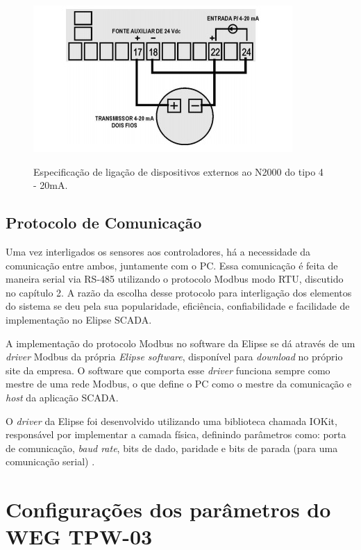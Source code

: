 \begin{figure}[h!]
\centering
\includegraphics[scale=1.0]{LigacaoNovus.jpg}
\caption{Especificação de ligação de dispositivos externos ao N2000 do tipo 4 - 20mA.} \cite{novus2014folheto}
\label{fig:LigacaoNovus}
\end{figure}

\subsection{Protocolo de Comunicação}

Uma vez interligados os sensores aos controladores, há a necessidade da comunicação entre ambos, juntamente com o PC. Essa comunicação é feita de maneira serial via RS-485 utilizando o protocolo Modbus modo RTU, discutido no capítulo 2. A razão da escolha desse protocolo para interligação dos elementos do sistema se deu pela sua popularidade, eficiência, confiabilidade e facilidade de implementação no Elipse SCADA.

A implementação do protocolo Modbus no software da Elipse se dá através de um \textit{driver} Modbus da própria \textit{Elipse software}, disponível para \textit{download} no próprio site da empresa. O software que comporta esse \textit{driver} funciona sempre como mestre de uma rede Modbus, o que define o PC como o mestre da comunicação e \textit{host} da aplicação SCADA.

O \textit{driver} da Elipse foi desenvolvido utilizando uma biblioteca chamada IOKit, responsável por implementar a camada física, definindo parâmetros como: porta de comunicação, \textit{baud rate}, bits de dado, paridade e bits de parada (para uma comunicação serial) \cite{iokit2009manual}. 

\section{Configurações dos parâmetros do WEG TPW-03}

